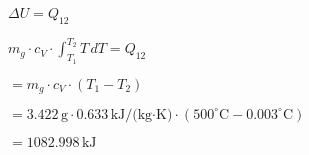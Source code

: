 \( \Delta U = Q_{12} \)  

\( m_g \cdot c_V \cdot \int_{T_1}^{T_2} T \, dT = Q_{12} \)  

\( = m_g \cdot c_V \cdot (T_1 - T_2) \)  

\( = 3.422 \, \text{g} \cdot 0.633 \, \text{kJ/(kg·K)} \cdot (500^\circ \text{C} - 0.003^\circ \text{C}) \)  

\( = 1082.998 \, \text{kJ} \)